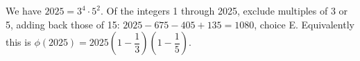 We have $2025=3^4\cdot5^2$. Of the integers 1 through 2025, exclude multiples of 3 or 5, adding back those of 15: $2025-675-405+135=\boxed{1080}$, choice E. Equivalently this is $\phi(2025)=2025(1-\dfrac{1}{3})(1-\dfrac{1}{5})$.
